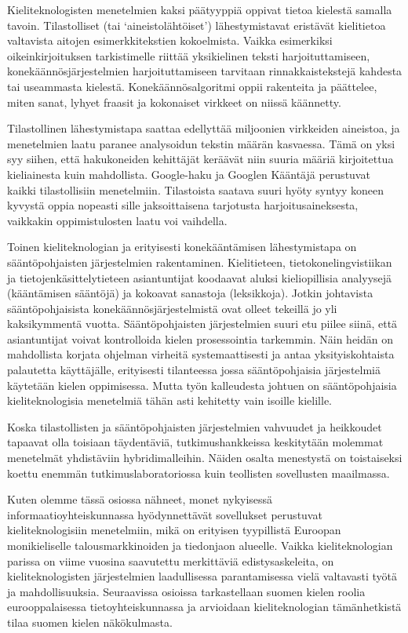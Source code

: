 \documentclass[]{../../metanetpaper}
\begin{document}
\begin{Parallel}[c]{70mm}{70mm}
{Kieliteknologisten menetelmien kaksi päätyyppiä oppivat tietoa kielestä samalla
tavoin. Tilastolliset (tai ‘aineistolähtöiset’) lähestymistavat eristävät
kielitietoa valtavista aitojen esimerkkitekstien kokoelmista. Vaikka
esimerkiksi oikeinkirjoituksen tarkistimelle riittää yksikielinen teksti
harjoituttamiseen, konekäännösjärjestelmien harjoituttamiseen tarvitaan
rinnakkaistekstejä kahdesta tai useammasta kielestä. Konekäännösalgoritmi oppii
rakenteita ja päättelee, miten sanat, lyhyet fraasit ja kokonaiset virkkeet on
niissä käännetty.

Tilastollinen lähestymistapa saattaa edellyttää miljoonien virkkeiden
aineistoa, ja menetelmien laatu paranee analysoidun tekstin määrän kasvaessa.
Tämä on yksi syy siihen, että hakukoneiden kehittäjät keräävät niin suuria
määriä kirjoitettua kieliainesta kuin mahdollista. Google-haku ja Googlen
Kääntäjä perustuvat kaikki tilastollisiin menetelmiin. Tilastoista saatava
suuri hyöty syntyy koneen kyvystä oppia nopeasti sille jaksoittaisena
tarjotusta harjoitusaineksesta, vaikkakin oppimistulosten laatu voi vaihdella.

Toinen kieliteknologian ja erityisesti konekääntämisen lähestymistapa on
sääntöpohjaisten järjestelmien rakentaminen. Kielitieteen,
tietokonelingvistiikan ja tietojenkäsittelytieteen asiantuntijat koodaavat
aluksi kieliopillisia analyysejä (kääntämisen sääntöjä) ja kokoavat sanastoja
(leksikkoja). Jotkin johtavista sääntöpohjaisista konekäännösjärjestelmistä
ovat olleet tekeillä jo yli kaksikymmentä vuotta. Sääntöpohjaisten
järjestelmien suuri etu piilee siinä, että asiantuntijat voivat kontrolloida
kielen prosessointia tarkemmin. Näin heidän on mahdollista korjata ohjelman
virheitä systemaattisesti ja antaa yksityiskohtaista palautetta käyttäjälle,
erityisesti tilanteessa jossa sääntöpohjaisia järjestelmiä käytetään kielen
oppimisessa. Mutta työn kalleudesta johtuen on sääntöpohjaisia
kieliteknologisia menetelmiä tähän asti kehitetty vain isoille kielille.

Koska tilastollisten ja sääntöpohjaisten järjestelmien vahvuudet ja heikkoudet
tapaavat olla toisiaan täydentäviä, tutkimushankkeissa keskitytään molemmat
menetelmät yhdistäviin hybridimalleihin. Näiden osalta menestystä on
toistaiseksi koettu enemmän tutkimuslaboratoriossa kuin teollisten sovellusten
maailmassa.

Kuten olemme tässä osiossa nähneet, monet nykyisessä informaatioyhteiskunnassa
hyödynnettävät sovellukset perustuvat kieliteknologisiin menetelmiin, mikä on
erityisen tyypillistä Euroopan monikieliselle talousmarkkinoiden ja tiedonjaon
alueelle. Vaikka kieliteknologian parissa on viime vuosina saavutettu
merkittäviä edistysaskeleita, on kieliteknologisten järjestelmien laadullisessa
parantamisessa vielä valtavasti työtä ja mahdollisuuksia. Seuraavissa osioissa
tarkastellaan suomen kielen roolia eurooppalaisessa tietoyhteiskunnassa ja
arvioidaan kieliteknologian tämänhetkistä tilaa suomen kielen näkökulmasta.
}


\end{Parallel}
\end{document}

